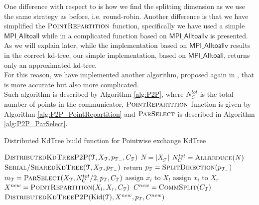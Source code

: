 \documentclass[amssymb, aps,nofootinbib, superscriptaddress, notitlepage]{revtex4}
\begin{document}
One difference with respect to \cite{xiao2016parallel} is how we find the splitting dimension as we use the same strategy as before, i.e.  round-robin. 
Another difference is that we have simplified the $\textsc{PointRepartition}$ function, specifically we have used a simple $\textsf{MPI\_Alltoall}$ while in \cite{xiao2016parallel} a complicated function based on $\textsf{MPI\_Alltoallv}$ is presented. 
\\
As we will explain later, while the implementation based on $\textsf{MPI\_Alltoallv}$ results in the correct kd-tree, our simple implementation, based on $\textsf{MPI\_Alltoall}$, returns only an approximated kd-tree.
\\
For this reason, we have implemented  another algorithm, proposed again in \cite{xiao2016parallel}, that is more accurate but also more complicated.
\\
Such algorithm is described by Algorithm \ref{alg:P2P}, where  $N^{tot}_{C}$ is the total number of points in the communicator, $\textsc{PointRepartition}$ function  is given by  Algorithm \ref{alg:P2P_PointRepartition} and $\textsc{ParSelect}$ is described in   Algorithm \ref{alg:P2P_ParSelect}.

\begin{algorithm}
\caption{Distributed KdTree build function for Pointwise exchange KdTree}\label{alg:P2P}
\begin{algorithmic}
\State  $\textsc{DistributedKdTreeP2P}(\mathcal{T},X_\mathcal{T},p_{\mathcal{T}_{-}},C_\mathcal{T})$
\State $N=|X_\mathcal{T}| $
\State $N^{tot}_{C}=\textsc{Allreduce}(N)$
    \State $\textsc{Serial/SharedKdTree}(\mathcal{T}, X_\mathcal{T},p_{\mathcal{T}_{-}})$
    \State $\text{return}$
\EndIf 
     \State $p_{\mathcal{T}}= \textsc{SplitDirection}(p_{\mathcal{T}_{-}}) $
        \State $m_\mathcal{T} = \textsc{ParSelect}(X_\mathcal{T},N^{tot}_{C}/2,p_{\mathcal{T}}, C_\mathcal{T})$
        \State $\text{assign } x_i \text{ to }  X_l$
  \Else
        \State $\text{assign } x_i \text{ to }  X_r$
        \EndIf
        \EndFor
        \State $X^{new} = \textsc{PointRepartition}(X_l,X_r, C_\mathcal{T})$
        \State $C^{new} = \textsc{CommSplit}(C_\mathcal{T})$
        \State $\textsc{DistributedKdTreeP2P}(\text{Kid}(\mathcal{T}),X^{new},p_{\mathcal{T}},C^{new})$
\end{algorithmic}
\end{algorithm}
\end{document}
